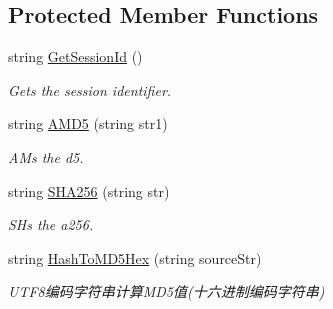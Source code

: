 \subsection*{Protected Member Functions}
\begin{DoxyCompactItemize}
\item 
string \mbox{\hyperlink{class_t_net_1_1_sns_1_1_abstract_login_ad89dd0e8baeffa08b2d5d28e6a2d68cd}{Get\+Session\+Id}} ()
\begin{DoxyCompactList}\small\item\em Gets the session identifier. \end{DoxyCompactList}\item 
string \mbox{\hyperlink{class_t_net_1_1_sns_1_1_abstract_login_a008f335a0c0edbc4acbfc56f60f6875e}{A\+M\+D5}} (string str1)
\begin{DoxyCompactList}\small\item\em A\+Ms the d5. \end{DoxyCompactList}\item 
string \mbox{\hyperlink{class_t_net_1_1_sns_1_1_abstract_login_af9da7affc6d7191fb81cc639182dfc6d}{S\+H\+A256}} (string str)
\begin{DoxyCompactList}\small\item\em S\+Hs the a256. \end{DoxyCompactList}\item 
string \mbox{\hyperlink{class_t_net_1_1_sns_1_1_abstract_login_a6d39f88db81a7b1d7c1c037e66d61df2}{Hash\+To\+M\+D5\+Hex}} (string source\+Str)
\begin{DoxyCompactList}\small\item\em U\+T\+F8编码字符串计算\+M\+D5值(十六进制编码字符串) \end{DoxyCompactList}\end{DoxyCompactItemize}
